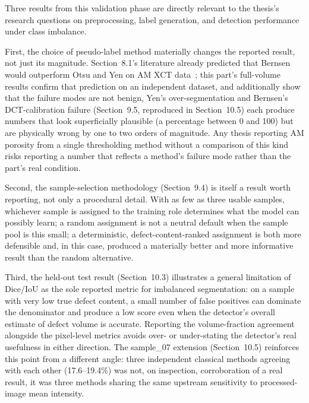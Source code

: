 
Three results from this validation phase are directly relevant to the thesis's research questions on
preprocessing, label generation, and detection performance under class imbalance.

First, the choice of pseudo-label method materially changes the reported result, not just its
magnitude. Section~8.1's literature already predicted that Bernsen would outperform Otsu and Yen on
AM XCT data~\citep{Kim2017}; this part's full-volume results confirm that prediction on an
independent dataset, and additionally show that the failure modes are not benign, Yen's
over-segmentation and Bernsen's DCT-calibration failure (Section~9.5, reproduced in Section~10.5)
each produce numbers that look superficially plausible (a percentage between 0 and 100) but are
physically wrong by one to two orders of magnitude. Any thesis reporting AM porosity from a single
thresholding method without a comparison of this kind risks reporting a number that reflects a
method's failure mode rather than the part's real condition.

Second, the sample-selection methodology (Section~9.4) is itself a result worth reporting, not only a
procedural detail. With as few as three usable samples, whichever sample is assigned to the training
role determines what the model can possibly learn; a random assignment is not a neutral default when
the sample pool is this small; a deterministic, defect-content-ranked assignment is both more
defensible and, in this case, produced a materially better and more informative result than the
random alternative.

Third, the held-out test result (Section~10.3) illustrates a general limitation of Dice/IoU as the
sole reported metric for imbalanced segmentation: on a sample with very low true defect content, a
small number of false positives can dominate the denominator and produce a low score even when the
detector's overall estimate of defect volume is accurate. Reporting the volume-fraction agreement
alongside the pixel-level metrics avoids over- or under-stating the detector's real usefulness in
either direction. The sample\_07 extension (Section~10.5) reinforces this point from a different
angle: three independent classical methods agreeing with each other (17.6--19.4\%) was not, on
inspection, corroboration of a real result, it was three methods sharing the same upstream
sensitivity to processed-image mean intensity.
